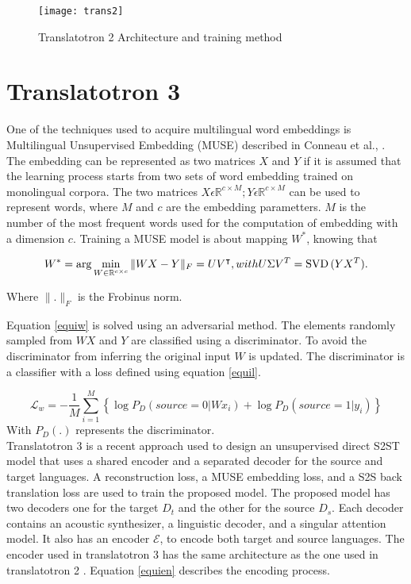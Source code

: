 \documentclass[12pt]{article}
\begin{document}
\begin{figure}[htbp]
    \centering
    \texttt{[image: trans2]} 
    \caption{Translatotron 2 Architecture and training method \cite{jia2}}
    \label{trans2}
\end{figure}

\section{Translatotron 3}
One of the techniques used to acquire multilingual word embeddings is Multilingual Unsupervised Embedding (MUSE) described in Conneau et al., \cite{con}. The embedding can be represented as two matrices $X$ and $Y$ if it is assumed that the learning process starts from two sets of word embedding trained on monolingual corpora. The two matrices $X \epsilon\mathbb{R}^{c\times M} ;  Y\epsilon\mathbb{R}^{c\times M}$ can be used to represent words, where $M$ and $c$ are the embedding parametters. $M$ is the number of the most frequent words used for the computation of embedding with a dimension $c$. Training a MUSE model is about mapping $W^{*}$, knowing that   

\begin{equation}
 W^* = \arg \min_{W \in \mathbb{R}^{c \times c}} \| W X - Y \|_F = U V^\intercal , 
 \\ with \\ U \Sigma V^T = \text{SVD} \, (Y X^T).  
\label{equiw}
\end{equation}

Where  $\| .\|_{F}$ is the Frobinus norm.

Equation \ref{equiw} is solved using an adversarial method. The elements randomly sampled from $WX$ and $Y$ are classified using a discriminator. To avoid the discriminator from inferring the original input $W$ is updated. The discriminator is a classifier with a loss defined using equation \ref{equil}.

\begin{equation}
 \mathcal{L}_w = -\frac{1}{M} \sum_{i=1}^M \left\{ \log P_D (source = 0 | Wx_i) + \log P_D (source = 1 | y_i) \right\} 
\label{equil}
\end{equation}
With $P_{D}(.)$ represents the discriminator. \\

Translatotron 3 \cite{nachmani} is a recent approach used to design an unsupervised direct S2ST model that uses a shared encoder and a separated decoder for the source and target languages. A reconstruction loss, a MUSE embedding loss, and a S2S back translation loss are used to train the proposed model. The proposed model has two decoders one for the target $D_{t}$ and the other for the source $D_{s}$. Each decoder contains an acoustic synthesizer, a linguistic decoder, and a singular attention model. It also has an encoder $ \mathcal{E}$, to encode both target and source languages. 
The encoder used in translatotron 3 has the same architecture as the one used in translatotron 2 \cite{jia2}. Equation \ref{equien} describes the encoding process.
\end{document}

